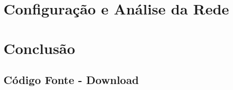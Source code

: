 \documentclass[11pt, a4paper]{article}
\begin{document}
\section{Configuração e Análise da Rede}


\section{Conclusão}


\printbibliography


\cleardoublepage

\begin{appendices}


\cleardoublepage



\cleardoublepage

\section{Código Fonte - Download}






\end{appendices}
\end{document}
